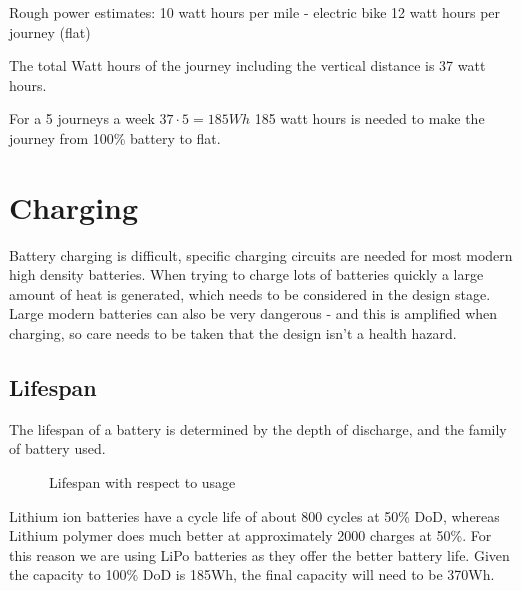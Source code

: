 \documentclass{article}
\begin{document}
Rough power estimates: 
10 watt hours per mile - electric bike
12 watt hours per journey (flat)

The total Watt hours of the journey including the vertical distance is 37 watt hours.

For a 5 journeys a week
$37 \cdot 5 = 185Wh$
185 watt hours is needed to make the journey from 100\% battery to flat.



\section{Charging}
Battery charging is difficult, specific charging circuits are needed for most modern high density batteries.
When trying to charge lots of batteries quickly a large amount of heat is generated, which needs to be considered in the design stage.
Large modern batteries can also be very dangerous - and this is amplified when charging, so care needs to be taken that the design isn't a health hazard.
\subsection{Lifespan}
The lifespan of a battery is determined by the depth of discharge, and the family of battery used.
\begin{figure}[H]
    \centering
    \caption{Lifespan with respect to usage}
    \label{fig:route}
\end{figure}
Lithium ion batteries have a cycle life of about 800 cycles at 50\% DoD, whereas Lithium polymer does much better at approximately 2000 charges at 50\%.
For this reason we are using LiPo batteries as they offer the better battery life.
Given the capacity to 100\% DoD is 185Wh, the final capacity will need to be 370Wh.
\end{document}
